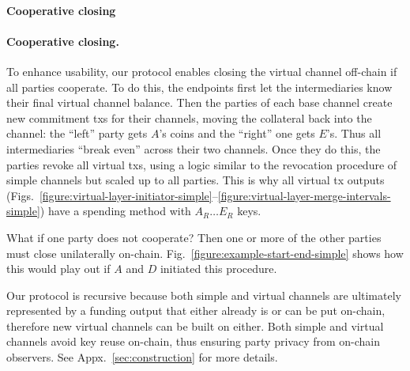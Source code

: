   \makeatletter%
    {\paragraph{Cooperative closing}}%
    {\paragraph{Cooperative closing.}}%
  \makeatother%
  To enhance usability, our protocol enables closing the virtual channel
  off-chain if all parties cooperate. To do this, the endpoints first
  let the intermediaries know their final virtual channel balance. Then the
  parties of each base channel create new commitment txs for their channels,
  moving the collateral back into the channel: the ``left'' party gets $A$'s
  coins and the ``right'' one gets $E$'s. Thus all intermediaries ``break even''
  across their two channels. Once they do this, the parties revoke all virtual
  txs, using a logic similar to the revocation procedure of simple channels but
  scaled up to all parties. This is why all virtual tx outputs
  (Figs.~\ref{figure:virtual-layer-initiator-simple}--\ref{figure:virtual-layer-merge-intervals-simple})
  have a spending method with $A_R \dots E_R$ keys.

  What if one party does not cooperate? Then one or more of the other parties must close
  unilaterally on-chain. Fig.~\ref{figure:example-start-end-simple} shows how
  this would play out if $A$ and $D$ initiated this procedure.

  Our protocol is recursive because both simple and virtual channels are
  ultimately represented by a funding output that either already is or can be put
  on-chain, therefore new virtual channels can be built on either.
  Both simple and virtual channels avoid key reuse on-chain, thus ensuring party
  privacy from on-chain observers. See Appx.~\ref{sec:construction} for more
  details.
